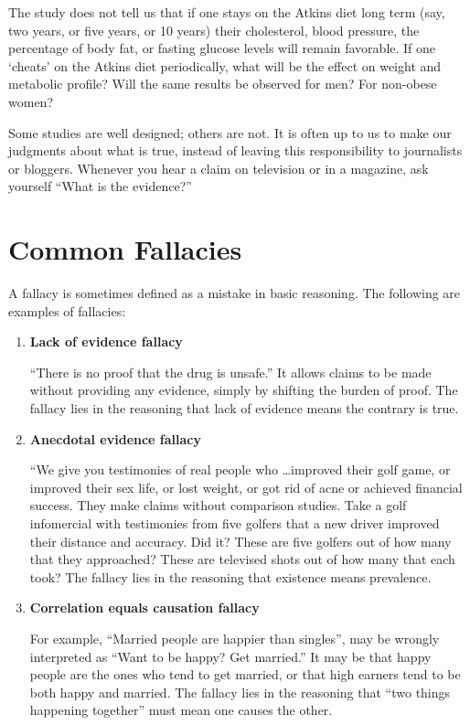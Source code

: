 \documentclass[11pt, chapterprefix=true]{scrbook}\usepackage[]{graphicx}\usepackage[]{color}
\begin{document}
The study does not tell us that if one stays on the Atkins diet long term (say, two years, or five years, or 10 years) their cholesterol, blood pressure, the percentage of body fat, or fasting glucose levels will remain favorable.  If one ‘cheats’ on the Atkins diet periodically, what will be the effect on weight and metabolic profile?  Will the same results be observed for men?  For non-obese women?

Some studies are well designed; others are not.  It is often up to us to make our judgments about what is true, instead of leaving this responsibility to journalists or bloggers.  Whenever you hear a claim on television or in a magazine, ask yourself ``What is the evidence?''

\section{Common Fallacies}

A fallacy is sometimes defined as a mistake in basic reasoning. The following are examples of fallacies:

\begin{enumerate}
\item \textbf{Lack of evidence fallacy}

``There is no proof that the drug is unsafe.''  It allows claims to be made without providing any evidence, simply by shifting the burden of proof.  The fallacy lies in the reasoning that lack of evidence means the contrary is true.

\item \textbf{Anecdotal evidence fallacy}

``We give you testimonies of real people who \dots improved their golf game, or improved their sex life, or lost weight, or got rid of acne or achieved financial success.  They make claims without comparison studies.  Take a golf infomercial with testimonies from five golfers that a new driver improved their distance and accuracy.  Did it?  These are five golfers out of how many that they approached?  These are televised shots out of how many that each took?  The fallacy lies in the reasoning that existence means prevalence.

\item \textbf{Correlation equals causation fallacy}

For example, ``Married people are happier than singles'', may be wrongly interpreted as ``Want to be happy? Get married.''  It may be that happy people are the ones who tend to get married, or that high earners tend to be both happy and married.  The fallacy lies in the reasoning that ``two things happening together'' must mean one causes the other.
\end{enumerate}
\end{document}
